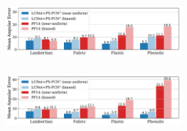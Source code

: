 \includegraphics[width=0.49\textwidth]{images/Results/SDPS-Net/synth/compare_PF14/dir_unif}\\
\vspace{-0.7em}
 \\
\includegraphics[width=0.49\textwidth]{images/Results/SDPS-Net/synth/compare_PF14/normal_unif}\\
\vspace{-0.7em}
\\
